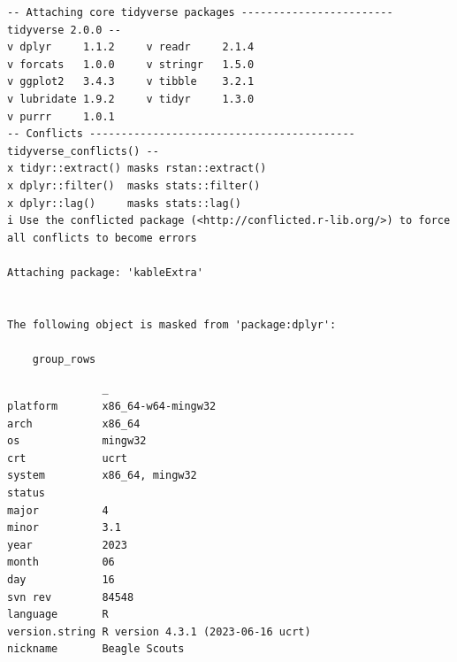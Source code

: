 \documentclass[
  letterpaper,
  DIV=11,
  numbers=noendperiod]{scrartcl}
\begin{document}
\begin{verbatim}
-- Attaching core tidyverse packages ------------------------ tidyverse 2.0.0 --
v dplyr     1.1.2     v readr     2.1.4
v forcats   1.0.0     v stringr   1.5.0
v ggplot2   3.4.3     v tibble    3.2.1
v lubridate 1.9.2     v tidyr     1.3.0
v purrr     1.0.1     
-- Conflicts ------------------------------------------ tidyverse_conflicts() --
x tidyr::extract() masks rstan::extract()
x dplyr::filter()  masks stats::filter()
x dplyr::lag()     masks stats::lag()
i Use the conflicted package (<http://conflicted.r-lib.org/>) to force all conflicts to become errors

Attaching package: 'kableExtra'


The following object is masked from 'package:dplyr':

    group_rows
\end{verbatim}

\begin{verbatim}
               _                                
platform       x86_64-w64-mingw32               
arch           x86_64                           
os             mingw32                          
crt            ucrt                             
system         x86_64, mingw32                  
status                                          
major          4                                
minor          3.1                              
year           2023                             
month          06                               
day            16                               
svn rev        84548                            
language       R                                
version.string R version 4.3.1 (2023-06-16 ucrt)
nickname       Beagle Scouts                    
\end{verbatim}
\end{document}
